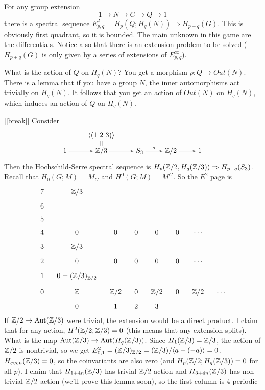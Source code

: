\begin{example}
 For any group extension
 \[
  1\to N\to G\to Q\to 1
 \]
 there is a spectral sequence $E^2_{p,q}=H_p(Q;H_q(N))\Rightarrow H_{p+q}(G)$. This is obviously first quadrant, so it is bounded. The main unknown in this game are the differentials. Notice also that there is an extension problem to be solved ($H_{p+q}(G)$ is only given by a series of extensions of $E^{\infty}_{p,q}$).
 
 What is the action of $Q$ on $H_q(N)$? You get a morphism $\rho\colon Q\to Out(N)$. There is a lemma that if you have a group $N$, the inner automorphisms act trivially on $H_q(N)$. It follows that you get an action of $Out(N)$ on $H_q(N)$, which induces an action of $Q$ on $H_q(N)$.
\end{example}

[[break]]
Consider
\[\xymatrix@R-1.5pc{
 & \<(1\ 2\ 3)\> \ar@{=}[d] \\
 1\ar[r]& \ZZ/3\ar[r]& S_3 \ar[r]^-\sigma & \ZZ/2\ar[r]& 1
}\]
Then the Hochschild-Serre spectral sequence is $H_p(\mathbb{Z}/2,H_q(\mathbb{Z}/3))\Rightarrow H_{p+q}(S_3)$. Recall that $H_0(G;M)=M_G$ and $H^0(G;M)=M^G$. So the $E^2$ page is
\[\xymatrix @R-1.5pc @C-1pc{
 7& \ZZ/3\\
 6& \\
 5& \\
 4& 0 & 0 & 0 & 0 & 0 & \cdots\\
 3& \ZZ/3\\
 2& 0 & 0 & 0 & 0 & 0 & \cdots\\
 1& 0=(\ZZ/3)_{\ZZ/2}\\
 0 & \ZZ & \ZZ/2 & 0 & \ZZ/2 & 0 & \ZZ/2 & \cdots\\
  & 0 & 1 & 2 & 3
}\]
If $\mathbb{Z}/2\to \operatorname{Aut}(\mathbb{Z}/3)$ were trivial, the extension would be a direct product. I claim that for any action, $H^2(\mathbb{Z}/2;\mathbb{Z}/3)=0$ (this means that any extension splits). What is the map $\operatorname{Aut}(\mathbb{Z}/3)\to \operatorname{Aut}(H_q(\mathbb{Z}/3))$. Since $H_1(\mathbb{Z}/3)=\mathbb{Z}/3$, the action of $\mathbb{Z}/2$ is nontrivial, so we get $E^2_{0,1}=(\mathbb{Z}/3)_{\mathbb{Z}/2} = (\mathbb{Z}/3)/\langle a-(-a)\rangle=0$. $H_{even}(\mathbb{Z}/3)=0$, so the coinvariants are also zero (and $H_p(\mathbb{Z}/2;H_q(\mathbb{Z}/3))=0$ for all $p$). I claim that $H_{1+4n}(\mathbb{Z}/3)$ has trivial $\mathbb{Z}/2$-action and $H_{3+4n}(\mathbb{Z}/3)$ has non-trivial $\mathbb{Z}/2$-action (we'll prove this lemma soon), so the first column is 4-periodic

